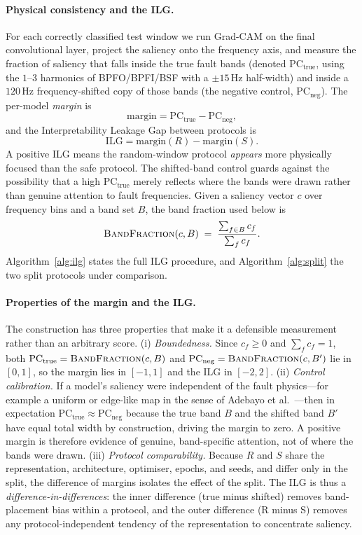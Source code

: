 \documentclass[11pt]{article}
\begin{document}
\paragraph{Physical consistency and the ILG.}
For each correctly classified test window we run Grad-CAM on the final convolutional
layer, project the saliency onto the frequency axis, and measure the fraction of
saliency that falls inside the true fault bands (denoted $\mathrm{PC_{true}}$, using the
$1$--$3$ harmonics of BPFO/BPFI/BSF with a $\pm15$\,Hz half-width) and inside a
$120$\,Hz frequency-shifted copy of those bands (the negative control,
$\mathrm{PC_{neg}}$). The per-model \emph{margin} is
\begin{equation}
\text{margin} = \mathrm{PC_{true}} - \mathrm{PC_{neg}},
\end{equation}
and the Interpretability Leakage Gap between protocols is
\begin{equation}
\mathrm{ILG} = \text{margin}(R) - \text{margin}(S).
\end{equation}
A positive ILG means the random-window protocol \emph{appears} more physically focused
than the safe protocol. The shifted-band control guards against the possibility that a
high $\mathrm{PC_{true}}$ merely reflects where the bands were drawn rather than genuine
attention to fault frequencies. Given a saliency vector $c$ over frequency bins and a band
set $B$, the band fraction used below is
\begin{equation}
\textsc{BandFraction}(c, B) \;=\; \frac{\sum_{f \in B} c_f}{\sum_{f} c_f}.
\end{equation}
Algorithm~\ref{alg:ilg} states the full ILG procedure, and Algorithm~\ref{alg:split} the
two split protocols under comparison.

\paragraph{Properties of the margin and the ILG.}
The construction has three properties that make it a defensible measurement rather than an
arbitrary score. (i) \emph{Boundedness.} Since $c_f \ge 0$ and $\sum_f c_f = 1$, both
$\mathrm{PC_{true}}=\textsc{BandFraction}(c,B)$ and $\mathrm{PC_{neg}}=\textsc{BandFraction}(c,B')$
lie in $[0,1]$, so the margin lies in $[-1,1]$ and the ILG in $[-2,2]$. (ii) \emph{Control
calibration.} If a model's saliency were independent of the fault physics---for example a
uniform or edge-like map in the sense of Adebayo et al.~\cite{adebayo2018sanity}---then in
expectation $\mathrm{PC_{true}}\approx\mathrm{PC_{neg}}$ because the true band $B$ and the
shifted band $B'$ have equal total width by construction, driving the margin to zero. A
positive margin is therefore evidence of genuine, band-specific attention, not of where
the bands were drawn. (iii) \emph{Protocol comparability.} Because $R$ and $S$ share the
representation, architecture, optimiser, epochs, and seeds, and differ only in the split,
the difference of margins isolates the effect of the split. The ILG is thus a
\emph{difference-in-differences}: the inner difference (true minus shifted) removes
band-placement bias within a protocol, and the outer difference (R minus S) removes any
protocol-independent tendency of the representation to concentrate saliency.
\end{document}
